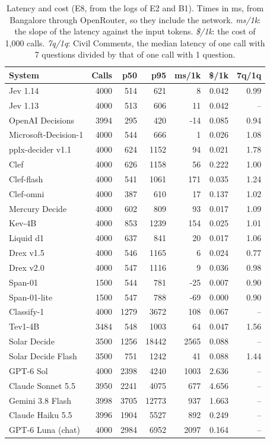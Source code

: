 \begin{table}[t]
\centering
\footnotesize
\setlength{\tabcolsep}{1.5pt}
\begin{tabular}{@{}lrrrrrr@{}}
\toprule
System & Calls & p50 & p95 & ms/1k & \$/1k & 7q/1q \\
\midrule
Jev 1.14 & 4000 & 514 & 621 & 8 & 0.042 & 0.99 \\
Jev 1.13 & 4000 & 513 & 606 & 11 & 0.042 & -- \\
OpenAI Decisions & 3994 & 295 & 420 & -14 & 0.085 & 0.94 \\
Microsoft-Decision-1 & 4000 & 544 & 666 & 1 & 0.026 & 1.08 \\
pplx-decider v1.1 & 4000 & 624 & 1152 & 94 & 0.021 & 1.78 \\
Clef & 4000 & 626 & 1158 & 56 & 0.222 & 1.00 \\
Clef-flash & 4000 & 541 & 1061 & 171 & 0.035 & 1.24 \\
Clef-omni & 4000 & 387 & 610 & 17 & 0.137 & 1.02 \\
Mercury Decide & 4000 & 602 & 809 & 93 & 0.017 & 1.09 \\
Kev-4B & 4000 & 853 & 1239 & 154 & 0.025 & 1.01 \\
Liquid d1 & 4000 & 637 & 841 & 20 & 0.017 & 1.06 \\
Drex v1.5 & 4000 & 546 & 1165 & 6 & 0.024 & 0.77 \\
Drex v2.0 & 4000 & 547 & 1116 & 9 & 0.036 & 0.98 \\
Span-01 & 1500 & 544 & 781 & -25 & 0.007 & 0.90 \\
Span-01-lite & 1500 & 547 & 788 & -69 & 0.000 & 0.90 \\
Classify-1 & 4000 & 1279 & 3672 & 108 & 0.067 & -- \\
Tev1-4B & 3484 & 548 & 1003 & 64 & 0.047 & 1.56 \\
Solar Decide & 3500 & 1256 & 18442 & 2565 & 0.088 & -- \\
Solar Decide Flash & 3500 & 751 & 1242 & 41 & 0.088 & 1.44 \\
GPT-6 Sol & 4000 & 2398 & 4240 & 1003 & 2.636 & -- \\
Claude Sonnet 5.5 & 3950 & 2241 & 4075 & 677 & 4.656 & -- \\
Gemini 3.8 Flash & 3998 & 3705 & 12773 & 937 & 1.663 & -- \\
Claude Haiku 5.5 & 3996 & 1904 & 5527 & 892 & 0.249 & -- \\
GPT-6 Luna (chat) & 4000 & 2984 & 6952 & 2097 & 0.164 & -- \\
\bottomrule
\end{tabular}
\caption{Latency and cost (E8, from the logs of E2 and B1). Times in ms, from Bangalore through OpenRouter, so they include the network. \emph{ms/1k}: the slope of the latency against the input tokens. \emph{\$/1k}: the cost of 1,000 calls. \emph{7q/1q}: Civil Comments, the median latency of one call with 7 questions divided by that of one call with 1 question.}
\label{tab:app-latency}
\end{table}
